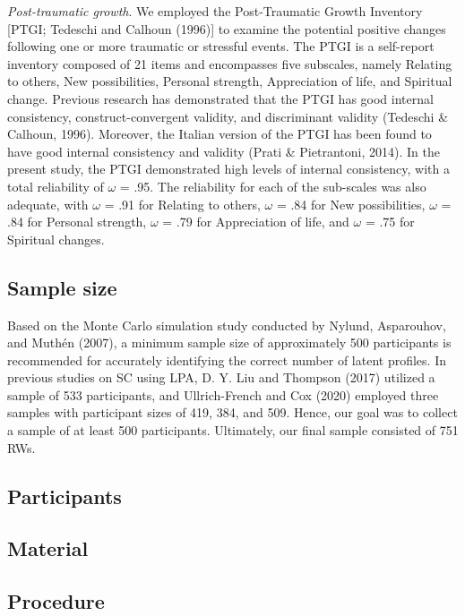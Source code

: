 \documentclass[
  man]{apa7}
\begin{document}
\emph{Post-traumatic growth}. We employed the Post-Traumatic Growth Inventory {[}PTGI; Tedeschi and Calhoun (1996){]} to examine the potential positive changes following one or more traumatic or stressful events. The PTGI is a self-report inventory composed of 21 items and encompasses five subscales, namely Relating to others, New possibilities, Personal strength, Appreciation of life, and Spiritual change. Previous research has demonstrated that the PTGI has good internal consistency, construct-convergent validity, and discriminant validity (Tedeschi \& Calhoun, 1996). Moreover, the Italian version of the PTGI has been found to have good internal consistency and validity (Prati \& Pietrantoni, 2014). In the present study, the PTGI demonstrated high levels of internal consistency, with a total reliability of \(\omega\) = .95. The reliability for each of the sub-scales was also adequate, with \(\omega\) = .91 for Relating to others, \(\omega\) = .84 for New possibilities, \(\omega\) = .84 for Personal strength, \(\omega\) = .79 for Appreciation of life, and \(\omega\) = .75 for Spiritual changes.

\hypertarget{sample-size}{%
\subsection{Sample size}\label{sample-size}}

Based on the Monte Carlo simulation study conducted by Nylund, Asparouhov, and Muthén (2007), a minimum sample size of approximately 500 participants is recommended for accurately identifying the correct number of latent profiles. In previous studies on SC using LPA, D. Y. Liu and Thompson (2017) utilized a sample of 533 participants, and Ullrich-French and Cox (2020) employed three samples with participant sizes of 419, 384, and 509. Hence, our goal was to collect a sample of at least 500 participants. Ultimately, our final sample consisted of 751 RWs.

\hypertarget{participants}{%
\subsection{Participants}\label{participants}}

\hypertarget{material}{%
\subsection{Material}\label{material}}

\hypertarget{procedure}{%
\subsection{Procedure}\label{procedure}}
\end{document}
